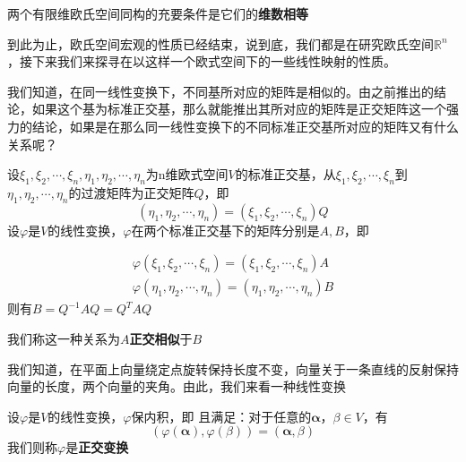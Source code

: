 \documentclass[lang=cn,10pt]{elegantbook}
\begin{document}
	\begin{corollary}
		两个有限维欧氏空间同构的充要条件是它们的\textbf{维数相等}
	\end{corollary}
	
	到此为止，欧氏空间宏观的性质已经结束，说到底，我们都是在研究欧氏空间$\mathbb{R}^{n}$，接下来我们来探寻在以这样一个欧式空间下的一些线性映射的性质。
	
	我们知道，在同一线性变换下，不同基所对应的矩阵是相似的。由之前推出的结论，如果这个基为标准正交基，那么就能推出其所对应的矩阵是正交矩阵这一个强力的结论，如果是在那么同一线性变换下的不同标准正交基所对应的矩阵又有什么关系呢？
	
	\begin{definition}
		设$
		\xi _1,\xi _2,\cdots ,\xi _n,\eta _1,\eta _2,\cdots ,\eta _n
		$为n维欧式空间$V$的标准正交基，从$
		\xi _1,\xi _2,\cdots ,\xi _n$到$\eta _1,\eta _2,\cdots ,\eta _n
		$的过渡矩阵为正交矩阵$Q$，即
		\begin{equation*}
			(\eta _1,\eta _2,\cdots ,\eta _n)=(\xi _1,\xi _2,\cdots ,\xi _n)Q
		\end{equation*}
		设$\varphi $是$V$的线性变换，$\varphi $在两个标准正交基下的矩阵分别是$A,B$，即
	
			\begin{equation*}
					\begin{split}
				\varphi(\xi _1,\xi _2,\cdots ,\xi _n)=(\xi _1,\xi _2,\cdots ,\xi _n)A
				\\
				\varphi(\eta _1,\eta _2,\cdots ,\eta _n)=(\eta _1,\eta _2,\cdots ,\eta _n)B
			\end{split}
			\end{equation*}
	则有$B=Q^{-1}AQ=Q^{T}AQ$
	
	我们称这一种关系为$A$\textbf{正交相似}于$B$
	\end{definition}
	
	我们知道，在平面上向量绕定点旋转保持长度不变，向量关于一条直线的反射保持向量的长度，两个向量的夹角。由此，我们来看一种线性变换
	\begin{definition}
		设$\varphi $是$V$的线性变换，$\varphi $保内积，即	$\text{且满足：对于任意的}\boldsymbol{\alpha }\text{，}\beta \in V\text{，有}
		$
		\begin{equation*}
			\left( \varphi \left( \boldsymbol{\alpha } \right) ,\varphi \left( \beta \right) \right) =\left( \boldsymbol{\alpha },\beta \right) 
		\end{equation*}
		我们则称$\varphi $是\textbf{正交变换}
	\end{definition}
	
\end{document}
